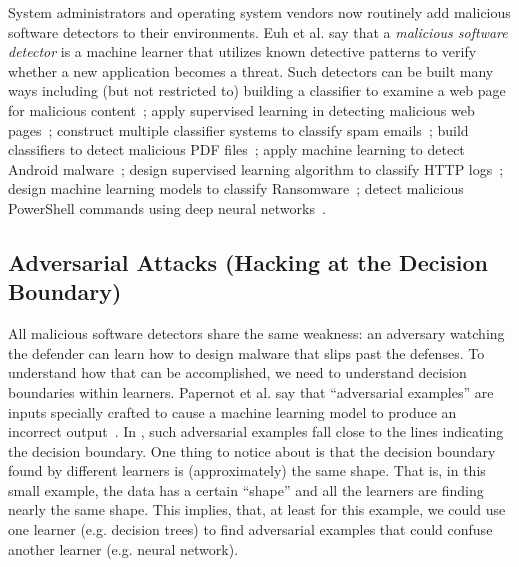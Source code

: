System administrators and   operating system vendors now routinely add malicious software detectors to their environments. 
 Euh et al. say that a {\em  malicious software detector} is a machine learner that utilizes known detective patterns to verify whether a new application becomes a threat. Such   detectors can be built many ways including
(but not restricted to) 
building a classifier to examine a web page for malicious content~\cite{canali2011prophiler};
apply supervised learning in detecting malicious web pages~\cite{eshete2012binspect};
construct multiple classifier systems to classify spam emails~\cite{biggio2010multiple};
build classifiers to detect malicious PDF files~\cite{xu2016automatically};
apply machine learning to detect Android malware~\cite{grosse2017adversarial};
design supervised learning algorithm to classify HTTP logs~\cite{liu2017robust};
design machine learning models to classify Ransomware~\cite{munoz2017towards};
detect malicious PowerShell commands using deep neural networks~\cite{hendler2018detecting}.
 
 
% 

\subsection{ Adversarial Attacks (Hacking at the Decision Boundary)}\label{khas}


  
 
 All  malicious software detectors  share the same weakness: an adversary watching the defender can learn how to design malware that slips past the defenses. To understand how that can be accomplished, we need
 to understand decision boundaries within learners. 
Papernot et al. say that   ``adversarial examples'' are  inputs     specially crafted to cause a machine learning model to produce an incorrect output~\cite{papernot2016transferability}.
In , such adversarial examples fall
close to the lines indicating the decision boundary.
One thing to notice about  is that the decision boundary found by different learners is (approximately) the   same shape. That is, in this small example, the data has a certain ``shape'' and all
the learners are finding nearly the same shape. This implies, that, at least for this example,
we could use one learner (e.g. decision trees) to find adversarial examples that could confuse
another learner (e.g. neural network). 

